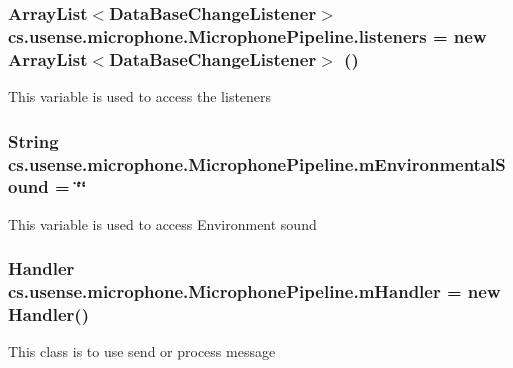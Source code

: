 \subsubsection[{listeners}]{\setlength{\rightskip}{0pt plus 5cm}Array\+List$<${\bf Data\+Base\+Change\+Listener}$>$ cs.\+usense.\+microphone.\+Microphone\+Pipeline.\+listeners = new Array\+List$<${\bf Data\+Base\+Change\+Listener}$>$ ()\hspace{0.3cm}{\ttfamily [private]}}\label{classcs_1_1usense_1_1microphone_1_1_microphone_pipeline_a1eff9feda79cd4a08ee49bb467f15ecc}
This variable is used to access the listeners \hypertarget{classcs_1_1usense_1_1microphone_1_1_microphone_pipeline_a179c8c39b7da546bad81cd44a0ccd7d3}{}
\subsubsection[{m\+Environmental\+Sound}]{\setlength{\rightskip}{0pt plus 5cm}String cs.\+usense.\+microphone.\+Microphone\+Pipeline.\+m\+Environmental\+Sound = \char`\"{}\char`\"{}\hspace{0.3cm}{\ttfamily [static]}}\label{classcs_1_1usense_1_1microphone_1_1_microphone_pipeline_a179c8c39b7da546bad81cd44a0ccd7d3}
This variable is used to access Environment sound \hypertarget{classcs_1_1usense_1_1microphone_1_1_microphone_pipeline_ab5a06361be8e86012bd686131f9aa369}{}
\subsubsection[{m\+Handler}]{\setlength{\rightskip}{0pt plus 5cm}Handler cs.\+usense.\+microphone.\+Microphone\+Pipeline.\+m\+Handler = new Handler()\hspace{0.3cm}{\ttfamily [private]}}\label{classcs_1_1usense_1_1microphone_1_1_microphone_pipeline_ab5a06361be8e86012bd686131f9aa369}
This class is to use send or process message \hypertarget{classcs_1_1usense_1_1microphone_1_1_microphone_pipeline_ae8bb2c4509baf886e1ff2e77bae8356b}{}
